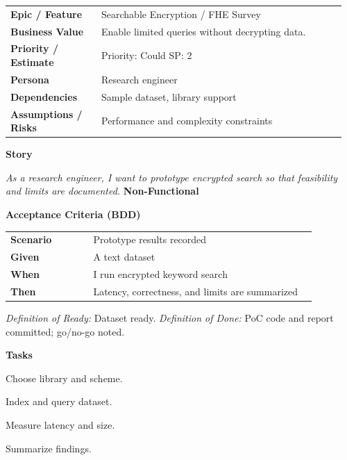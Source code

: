\documentclass[11pt,letterpaper]{article}
\makeatletter
\newenvironment{kvtable}{%
  \begin{tabular}{@{}>{\bfseries\arraybackslash}p{0.26\linewidth} p{0.70\linewidth}@{}}
}{\end{tabular}}
\newenvironment{bdd}{%
  \begin{tabular}{@{}>{\bfseries\arraybackslash}p{0.26\linewidth} p{0.70\linewidth}@{}}
}{\end{tabular}}
\newcommand{\DoRDoD}[2]{%
  \vspace{0.35em}
  {\footnotesize\color{Muted}%
    \textit{Definition of Ready:} #1 \; \textbullet\;
    \textit{Definition of Done:} #2%
  }%
}
\newenvironment{storycard}[2]{%
  \begin{tcolorbox}[cloudcard, title={#1 --- #2}]%
}{\end{tcolorbox}}
\newcommand{\sectionlabel}[1]{\vspace{0.35em}\textbf{#1}\par}
\makeatother
\begin{document}
\begin{storycard}{CCS-23}{Ch. 23 — Computation Over Encrypted Data}
\begin{kvtable}
Epic / Feature & Searchable Encryption / FHE Survey\\
Business Value & Enable limited queries without decrypting data.\\
Priority / Estimate & Priority: Could \quad SP: 2\\
Persona & Research engineer\\
Dependencies & Sample dataset, library support\\
Assumptions / Risks & Performance and complexity constraints\\
\end{kvtable}
\sectionlabel{Story}
\textit{As a research engineer, I want to prototype encrypted search so that feasibility and limits are documented.}
\sectionlabel{Non-Functional}\;
\sectionlabel{Acceptance Criteria (BDD)}
\begin{bdd}
Scenario & Prototype results recorded\\
Given & A text dataset\\
When & I run encrypted keyword search\\
Then & Latency, correctness, and limits are summarized\\
\end{bdd}
\DoRDoD{Dataset ready.}{PoC code and report committed; go/no-go noted.}
\sectionlabel{Tasks}
\begin{checklist}
\item Choose library and scheme.
\item Index and query dataset.
\item Measure latency and size.
\item Summarize findings.
\end{checklist}
\end{storycard}
\end{document}
